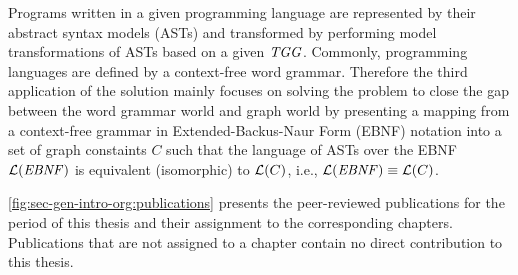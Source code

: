 Programs written in a given programming language are represented by their abstract syntax models (ASTs) and transformed by performing model transformations of ASTs based on a given $\mathit{TGG}$.
Commonly, programming languages are defined by a context-free word grammar.
Therefore the third application of the solution mainly focuses on %
solving the %
problem to close the gap between the word grammar world and graph world by presenting a mapping from a context-free grammar in Extended-Backus-Naur Form (EBNF) notation into a set of graph constaints $C$ such that the language of ASTs over the EBNF $\mathcal{L}(\mathit{EBNF})$ is equivalent (isomorphic) to $\mathcal{L}(C)$, i.e., $\mathcal{L}(\mathit{EBNF}) \equiv \mathcal{L}(C)$.

\cref{fig:sec-gen-intro-org:publications} presents the peer-reviewed publications for the period of this thesis and their assignment to the corresponding chapters.
Publications that are not assigned to a chapter contain no direct contribution to this thesis.

